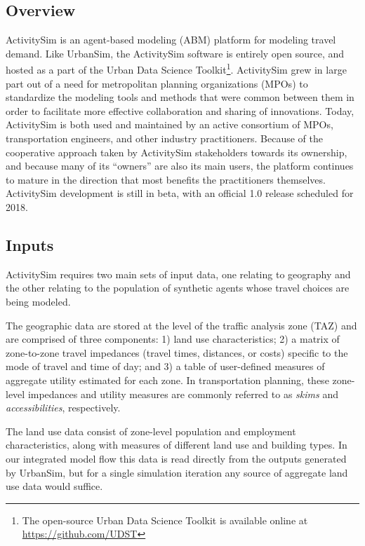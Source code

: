 \subsection{Overview}

ActivitySim is an agent-based modeling (ABM) platform for modeling travel demand. Like UrbanSim, the ActivitySim software is entirely open source, and hosted as a part of the Urban Data Science Toolkit\footnote{The open-source Urban Data Science Toolkit is available online at \url{https://github.com/UDST}}. ActivitySim grew in large part out of a need for metropolitan planning organizations (MPOs) to standardize the modeling tools and methods that were common between them in order to facilitate more effective collaboration and sharing of innovations. Today, ActivitySim is both used and maintained by an active consortium of MPOs, transportation engineers, and other industry practitioners. Because of the cooperative approach taken by ActivitySim stakeholders towards its ownership, and because many of its \enquote{owners} are also its main users, the platform continues to mature in the direction that most benefits the practitioners themselves. ActivitySim development is still in beta, with an official 1.0 release scheduled for 2018.

\subsection{Inputs}

ActivitySim requires two main sets of input data, one relating to geography and the other relating to the population of synthetic agents whose travel choices are being modeled.

The geographic data are stored at the level of the traffic analysis zone (TAZ) and are comprised of three components: 1) land use characteristics; 2) a matrix of zone-to-zone travel impedances (travel times, distances, or costs) specific to the mode of travel and time of day; and 3) a table of user-defined measures of aggregate utility estimated for each zone. In transportation planning, these zone-level impedances and utility measures are commonly referred to as \emph{skims} and \emph{accessibilities}, respectively.

The land use data consist of zone-level population and employment characteristics, along with measures of different land use and building types. In our integrated model flow this data is read directly from the outputs generated by UrbanSim, but for a single simulation iteration any source of aggregate land use data would suffice.

